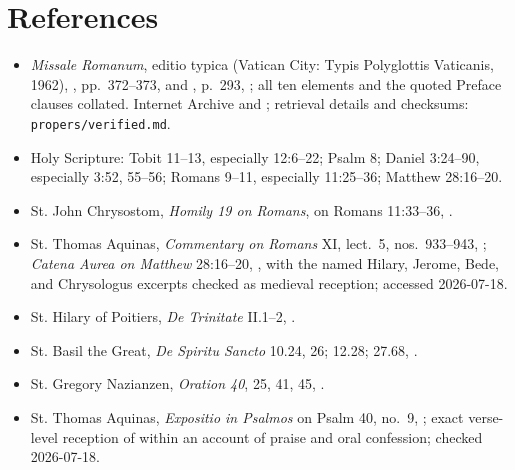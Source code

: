 \section*{References}
{\small
\begin{itemize}
\item \emph{Missale Romanum}, editio typica (Vatican City: Typis Polyglottis Vaticanis, 1962), , pp.~372--373, and , p.~293, ; all ten elements and the quoted Preface clauses collated. Internet Archive  and ; retrieval details and checksums: \nolinkurl{propers/verified.md}.
\item Holy Scripture: Tobit 11--13, especially 12:6--22; Psalm 8; Daniel 3:24--90, especially 3:52, 55--56; Romans 9--11, especially 11:25--36; Matthew 28:16--20.
\item St. John Chrysostom, \emph{Homily 19 on Romans}, on Romans 11:33--36, .
\item St. Thomas Aquinas, \emph{Commentary on Romans} XI, lect.~5, nos.~933--943, ; \emph{Catena Aurea on Matthew} 28:16--20, , with the named Hilary, Jerome, Bede, and Chrysologus excerpts checked as medieval reception; accessed 2026-07-18.
\item St. Hilary of Poitiers, \emph{De Trinitate} II.1--2, .
\item St. Basil the Great, \emph{De Spiritu Sancto} 10.24, 26; 12.28; 27.68, .
\item St. Gregory Nazianzen, \emph{Oration 40}, 25, 41, 45, .
\item St. Thomas Aquinas, \emph{Expositio in Psalmos} on Psalm 40, no.~9, ; exact verse-level reception of  within an account of praise and oral confession; checked 2026-07-18.

\end{itemize}}
